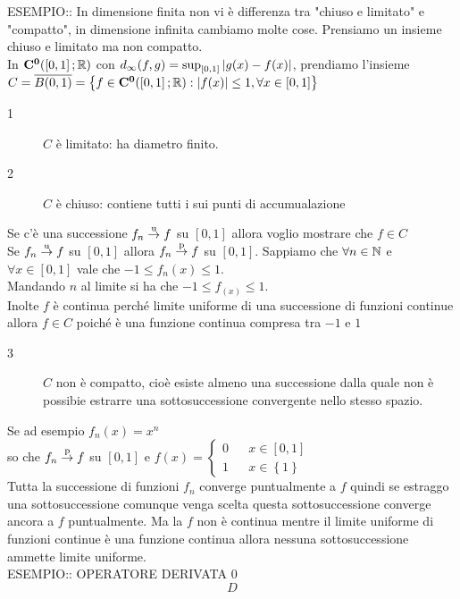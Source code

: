 ESEMPIO:: In dimensione finita non vi è differenza tra "chiuso e limitato" e "compatto", in dimensione infinita cambiamo molte cose.
Prensiamo un insieme chiuso e limitato ma non compatto.\\
In $\mathbf{C^{0}}(\left[0,1\right]; \mathbb{R})$ con $d_\infty(f,g)=\sup_{\left[0,1\right]}\left|g(x)-f(x)\right|$, prendiamo l'insieme $C=\overline{B(0,1)}=\left\{f\in \mathbf{C^{0}}(\left[0,1\right]; \mathbb{R}):\left|f(x)\right|\le 1, \forall x \in\left[0,1\right]\right\}$
\begin{description}
	\item[1] $C$ è limitato: ha diametro finito.
	\item[2] $C$ è chiuso: contiene tutti i sui punti di accumualazione
\end{description}
Se c'è una successione $f_n \overset{\text{u}}{\to} f$ su $\left[0,1\right]$ allora voglio mostrare che $f\in C$\\
Se $f_n \overset{\text{u}}{\to} f$ su $\left[0,1\right]$ allora $f_n \overset{\text{p}}{\to} f$ su $\left[0,1\right]$.
Sappiamo che $\forall n\in\mathbb{N}$ e $\forall x\in \left[0,1\right]$ vale che $-1\le f_n(x)\le 1$.\\
Mandando $n$ al limite si ha che $-1\le f_(x)\le 1$.\\
Inolte $f$ è continua perché limite uniforme di una successione di funzioni continue allora $f\in C$ poiché è una funzione continua compresa tra $-1$ e $1$
\begin{description}
	\item[3] $C$ non è compatto, cioè esiste almeno una successione dalla quale non è possibie estrarre una sottosuccessione convergente nello stesso spazio.
\end{description}
Se ad esempio $f_n(x) = x^n$\\
so che $f_n \overset{\text{p}}{\to} f$ su $\left[0,1\right]$ e $f(x)=\left\{\begin{matrix}0&&x\in\left[0,1\right]\\1&&x\in\left\{1\right\}\end{matrix}\right.$\\
Tutta la successione di funzioni $f_n$ converge puntualmente a $f$ quindi se estraggo una sottosuccessione comunque venga scelta questa sottosuccessione converge ancora a $f$ puntualmente. Ma la $f$ non è continua mentre il limite uniforme di funzioni continue è una funzione continua allora nessuna sottosuccessione ammette limite uniforme.\\

ESEMPIO:: OPERATORE DERIVATA 0\\
$$D$$

